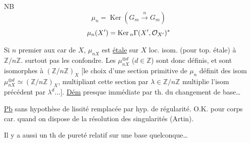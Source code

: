 

NB
\[
\mu_n=\operatorname{Ker}(G_m\xrightarrow{n}G_m)
\]
\[
\mu_n(X')={\operatorname{Ker}}\,{}_n\Gamma(X',\mathcal O_{X'})^*
\]

Si $n$ premier aux car de $X$, $\mu_{nX}$ est \uline{étale} sur $X$
loc. isom. (pour top. étale) à $\mathbb Z/n\mathbb Z$. 
surtout pas les confondre. Les $\mu_{nX}^{\otimes d}$
($d\in\mathbb Z$) sont donc définis, et sont  isomorphes à $(\mathbb Z/n\mathbb Z)_X$
[le choix d'une section primitive de $\mu_n$ définit des isom
$\mu_{nX}^{\otimes d}\simeq(\mathbb Z/n\mathbb Z)_X$, multipliant cette
section par $\lambda\in\mathbb Z/n\mathbb Z$ multiplie l'isom
précédent par $\lambda^d\ldots$].
\uline{Dém} presque immédiate par th. du changement de base\ldots

\uline{Pb} sans hypothèse de lissité remplacée par hyp.
de régularité. O.K. 
pour corps car.  quand on
dispose de la résolution des singularités (Artin).

Il y a aussi un th de pureté relatif sur
une base quelconque\ldots



